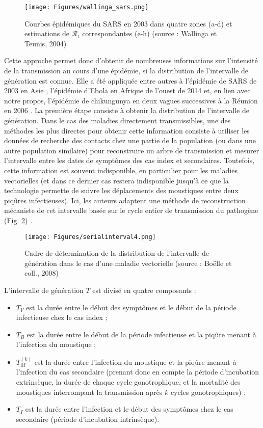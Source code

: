 \begin{figure}[t]
	\centering
	\texttt{[image: Figures/wallinga\_sars.png]}
	\caption{Courbes épidémiques du SARS en 2003 dans quatre zones (a-d) et estimations de $\mathcal{R}_t$ correspondantes (e-h) (source : Wallinga et Teunis, 2004)}
	\label{fig:wallinga_sars}
\end{figure}


Cette approche permet donc d'obtenir de nombreuses informations sur l'intensité de la transmission au cours d'une épidémie, si la distribution de l'intervalle de génération est connue.
Elle a été appliquée entre autres à l'épidémie de SARS de 2003 en Asie \cite{wallinga2004different,cauchemez2006real}, l'épidémie d'Ebola en Afrique de l'ouest de 2014 \cite{who2014ebola} et, en lien avec notre propos, l'épidémie de chikungunya en deux vagues successives à la Réunion en 2006 \cite{boelle_investigating_2008}.
La première étape consiste à obtenir la distribution de l'intervalle de génération.
Dans le cas des maladies directement transmissibles, une des méthodes les plus directes pour obtenir cette information consiste à utiliser les données de recherche des contacts chez une partie de la population (ou dans une autre population similaire) pour reconstruire un arbre de transmission et mesurer l'intervalle entre les dates de symptômes des cas index et secondaires.
Toutefois, cette information est souvent indisponible, en particulier pour les maladies vectorielles (et dans ce dernier cas restera indisponible jusqu'à ce que la technologie permette de suivre les déplacements des moustiques entre deux piqûres infectieuses).
Ici, les auteurs adaptent une méthode de reconstruction mécaniste de cet intervalle basée sur le cycle entier de transmission du pathogène (Fig. \ref{fig:boelle_cadre}) \cite{fine2003interval}.
\begin{figure}[t]
	\centering
	\texttt{[image: Figures/serialinterval4.png]}
	\caption{Cadre de détermination de la distribution de l'intervalle de génération dans le cas d'une maladie vectorielle (source : Boëlle et coll., 2008)}
	\label{fig:boelle_cadre}
\end{figure}
L'intervalle de génération $T$ est divisé en quatre composants :
\begin{itemize}
\item $T_V$ est la durée entre le début des symptômes et le début de la période infectieuse chez le cas index ;
\item $T_B$ est la durée entre le début de la période infectieuse et la piqûre menant à l'infection du moustique ;
\item $T_M^{(k)}$ est la durée entre l'infection du moustique et la piqûre menant à l'infection du cas secondaire (prenant donc en compte la période d'incubation extrinsèque, la durée de chaque cycle gonotrophique, et la mortalité des moustiques interrompant la transmission après $k$ cycles gonotrophiques) ;
\item $T_I$ est la durée entre l'infection et le début des symptômes chez le cas secondaire (période d'incubation intrinsèque).
\end{itemize}
